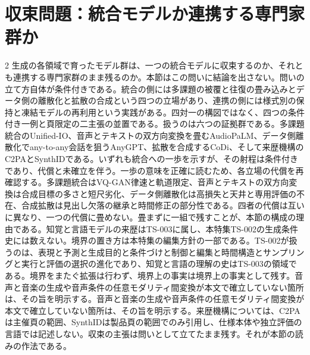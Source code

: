 \documentclass[lualatex,a4paper,10pt]{jlreq}
\begin{document}
\section{収束問題：統合モデルか連携する専門家群か}
\label{sec:convergence}

\begin{multicols}{2}
\raggedcolumns
生成の各領域で育ったモデル群は、一つの統合モデルに収束するのか、それとも連携する専門家群のまま残るのか。本節はこの問いに結論を出さない\autocite{btd094,btd097}。問いの立て方自体が条件付きである。統合の側には多課題の被覆と往復の畳み込みとデータ側の離散化と拡散の合成という四つの立場があり、連携の側には様式別の保持と凍結モデルの再利用という実践がある。四対一の構図ではなく、四つの条件付き一例と頁限定の二主張の並置である。扱うのは六つの証拠群である。多課題統合のUnified-IO、音声とテキストの双方向変換を畳むAudioPaLM、データ側離散化でany-to-any会話を狙うAnyGPT、拡散を合成するCoDi、そして来歴機構のC2PAとSynthIDである\autocite{btd094,btd095,btd096,btd097,btd098,btd099}。いずれも統合への一歩を示すが、その射程は条件付きであり、代償と未確立を伴う\autocite{btd094,btd095,btd096,btd097}。一歩の意味を正確に読むため、各立場の代償を再確認する。多課題統合はVQ-GAN律速と軌道限定、音声とテキストの双方向変換は合成目標の多さと短尺劣化、データ側離散化は高損失と天井と専用評価の不在、合成拡散は見出し欠落の継承と時間修正の部分性である。四者の代償は互いに異なり、一つの代償に畳めない。畳まずに一組で残すことが、本節の構成の理由である。知覚と言語モデルの来歴はTS-003に属し、本特集TS-002の生成条件史には数えない\autocite{btd094}。境界の置き方は本特集の編集方針の一部である。TS-002が扱うのは、表現と予測と生成目的と条件づけと制御と編集と時間構造とサンプリングと実行と評価の選択の進化であり、知覚と言語の理解の史はTS-003の領域である。境界をまたぐ拡張は行わず、境界上の事実は境界上の事実として残す。音声と音楽の生成や音声条件の任意モダリティ間変換が本文で確立していない箇所は、その旨を明示する。音声と音楽の生成や音声条件の任意モダリティ間変換が本文で確立していない箇所は、その旨を明示する。来歴機構については、C2PAは主催頁の範囲、SynthIDは製品頁の範囲でのみ引用し、仕様本体や独立評価の言語では記述しない。収束の主張は問いとして立てたまま残す。それが本節の読みの作法である\autocite{btd094,btd098}。


\end{multicols}
\end{document}
